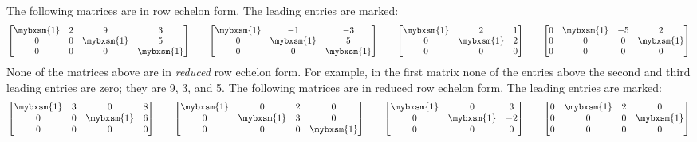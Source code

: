 \begin{example}
The following matrices are in row echelon form.  The leading
entries are marked:
\begin{equation*}
\begin{bmatrix}
\mybxsm{1} & 2 & 9 & 3 \\
0 & 0 & \mybxsm{1} & 5 \\
0 & 0 & 0 & \mybxsm{1}
\end{bmatrix}
\qquad
\begin{bmatrix}
\mybxsm{1} & -1 & -3  \\
0 & \mybxsm{1} & 5  \\
0 & 0 & \mybxsm{1}
\end{bmatrix}
\qquad
\begin{bmatrix}
\mybxsm{1} & 2 & 1 \\
0 & \mybxsm{1} & 2 \\
0 & 0 & 0
\end{bmatrix}
\qquad
\begin{bmatrix}
0 & \mybxsm{1} & -5 & 2 \\
0 & 0 & 0 & \mybxsm{1} \\
0 & 0 & 0 & 0
\end{bmatrix}
\end{equation*}
None of the matrices above are in \emph{reduced} row echelon form.  For
example, in the first matrix none of the entries above the second and third
leading entries are zero; they are 9, 3, and 5.
The following matrices are in reduced row echelon form.  The leading
entries are marked:
\begin{equation*}
\begin{bmatrix}
\mybxsm{1} & 3 & 0 & 8 \\
0 & 0 & \mybxsm{1} & 6 \\
0 & 0 & 0 & 0
\end{bmatrix}
\qquad
\begin{bmatrix}
\mybxsm{1} & 0 & 2 &  0  \\
0 & \mybxsm{1} & 3 & 0  \\
0 & 0 & 0 & \mybxsm{1}
\end{bmatrix}
\qquad
\begin{bmatrix}
\mybxsm{1} & 0 & 3 \\
0 & \mybxsm{1} & -2 \\
0 & 0 & 0
\end{bmatrix}
\qquad
\begin{bmatrix}
0 & \mybxsm{1} & 2 & 0 \\
0 & 0 & 0 & \mybxsm{1} \\
0 & 0 & 0 & 0
\end{bmatrix}
\end{equation*}
\end{example}

